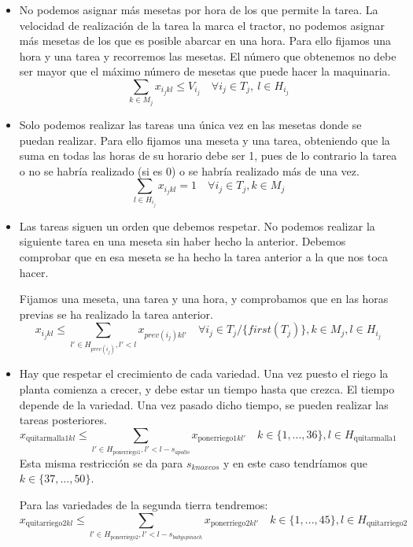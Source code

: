 \begin{itemize}
    \item  No podemos asignar más mesetas por hora de los que permite la tarea.
           La velocidad de realización de la tarea la marca el tractor, no podemos asignar más mesetas de los que es posible abarcar en una hora.
           Para ello fijamos una hora y una tarea y recorremos las mesetas. El número que obtenemos no debe ser mayor que el máximo número de mesetas que puede hacer la maquinaria. 
	    \[
            \sum_{k\in M_j}x_{i_j kl} \leq V_{i_j} \quad \forall i_j \in T_j, \ l\in H_{i_j}
        \]
    \item  Solo podemos realizar las tareas una única vez en las mesetas donde se puedan realizar.
           Para ello fijamos una meseta y una tarea, obteniendo que la suma en todas las horas de su horario debe ser 1,
           pues de lo contrario la tarea o no se habría realizado (si es 0) o se habría realizado más de una vez. 
        \[
	        \sum_{l\in H_{i_j}}x_{i_j kl} =1 \quad \forall i_j \in T_j , k \in M_j
        \]
    \item Las tareas siguen un orden que debemos respetar.
          No podemos realizar la siguiente tarea en una meseta sin haber hecho la anterior.
          Debemos comprobar que en esa meseta se ha hecho la tarea anterior a la que nos toca hacer. 
	
	      Fijamos una meseta, una tarea y una hora, y comprobamos que en las horas previas se ha realizado la tarea anterior. 
        \[
	        x_{i_j kl} \leq \sum_{l' \in H_{prev(i_j)}, l'<l}x_{prev(i_j)kl'} \quad \forall i_j\in T_j/\{first(T_j)\}, k\in M_j, l \in H_{i_j}
        \]
	
    \item  Hay que respetar el crecimiento de cada variedad. Una vez puesto el riego la planta comienza a crecer,
           y debe estar un tiempo hasta que crezca. El tiempo depende de la variedad.
           Una vez pasado dicho tiempo, se pueden realizar las tareas posteriores.
        \[
	        x_{\text{quitarmalla}1 kl} \leq \sum_{l'\in H_{\text{ponerriego}1}, l'<l-s_{apollo}}x_{\text{ponerriego}1kl'} \quad k\in \{1, ..., 36\}, l\in H_{\text{quitarmalla}1}
        \]
	    Esta misma restricción se da para $s_{knoxcos}$ y en este caso tendríamos que $k \in \{37, ..., 50\}$. 
	
        Para las variedades de la segunda tierra tendremos:
        \[
	        x_{\text{quitarriego}2 kl} \leq \sum_{l'\in H_{\text{ponerriego}2}, l'<l-s_{babyspinach}}x_{\text{ponerriego}2kl'} \quad k\in \{1, ..., 45\}, l\in H_{\text{quitarriego}2}
        \]


\end{itemize}
